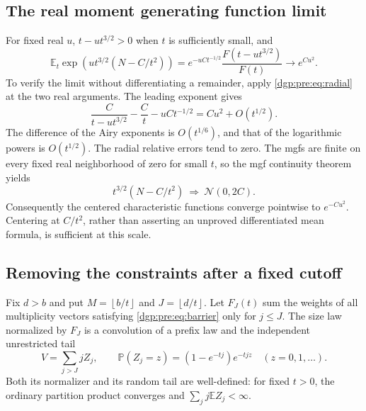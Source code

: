 \documentclass[11pt,letterpaper]{article}
\numberwithin{equation}{section}
\theoremstyle{remark}\newtheorem{remark}[theorem]{Remark}
\newcommand{\PP}{\mathbb P}
\newcommand{\EE}{\mathbb E}
\newcommand{\floor}[1]{\left\lfloor #1\right\rfloor}
\begin{document}
\subsection{The real moment generating function limit}
For fixed real $u$, $t-ut^{3/2}>0$ when $t$ is sufficiently small, and
\begin{equation}
 \EE_t\exp\left(u t^{3/2}(N-C/t^2)\right)
 =e^{-uCt^{-1/2}}\frac{F(t-ut^{3/2})}{F(t)}
 \longrightarrow e^{Cu^2}.
 \label{dgp:pre:eq:mgf}
\end{equation}
To verify the limit without differentiating a remainder, apply
\eqref{dgp:pre:eq:radial} at the two real arguments. The leading exponent gives
\[
 \frac{C}{t-ut^{3/2}}-\frac Ct-uCt^{-1/2}=Cu^2+O(t^{1/2}).
\]
The difference of the Airy exponents is $O(t^{1/6})$, and that of the
logarithmic powers is $O(t^{1/2})$. The radial relative errors tend to
zero. The mgfs are finite on every fixed real neighborhood of zero
for small $t$, so the mgf continuity theorem yields
\begin{equation}
 t^{3/2}(N-C/t^2)\ \Rightarrow\ \mathcal N(0,2C).
 \label{dgp:pre:eq:clt}
\end{equation}
Consequently the centered characteristic functions converge pointwise
to $e^{-Cu^2}$. Centering at $C/t^2$, rather than asserting an
unproved differentiated mean formula, is sufficient at this scale.

\subsection{Removing the constraints after a fixed cutoff}
Fix $d>b$ and put $M=\floor{b/t}$ and $J=\floor{d/t}$.
Let $F_J(t)$ sum the weights of all multiplicity vectors satisfying
\eqref{dgp:pre:eq:barrier} only for $j\leq J$. The size law normalized by $F_J$
is a convolution of a prefix law and the independent unrestricted tail
\begin{equation}
 V=\sum_{j>J}jZ_j,\qquad
 \PP(Z_j=z)=(1-e^{-tj})e^{-tjz}\quad(z=0,1,\ldots).
 \label{dgp:pre:eq:tail}
\end{equation}
Both its normalizer and its random tail are well-defined: for fixed
$t>0$, the ordinary partition product converges and
$\sum_j j\EE Z_j<\infty$.
\end{document}
